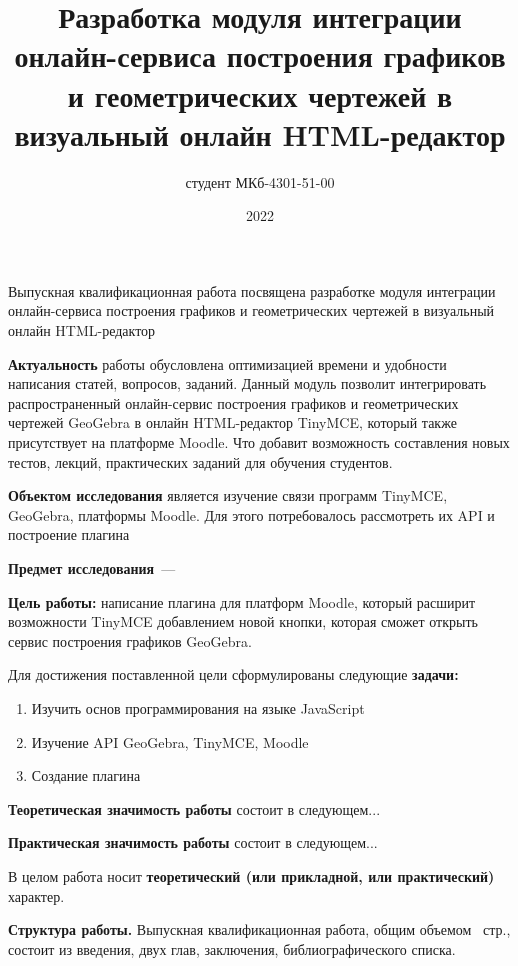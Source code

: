 \documentclass[14pt,Diplom]{diplomwork}
\date{2022}
\author{студент МКб-4301-51-00}{Мельков Алексей Константинович}
\title{Разработка модуля интеграции онлайн-сервиса построения графиков и геометрических чертежей в визуальный онлайн HTML-редактор}
\institute{математики и информационных систем}
\begin{document}
	
\maketitle
\makereferat		%
\newpage

\tableofcontents


Выпускная квалификационная работа посвящена разработке модуля интеграции онлайн-сервиса построения графиков и геометрических чертежей в визуальный онлайн HTML-редактор


\textbf{Актуальность} работы обусловлена оптимизацией времени и удобности написания статей, вопросов, заданий. Данный модуль позволит интегрировать распространенный онлайн-сервис построения графиков и геометрических чертежей GeoGebra в онлайн HTML-редактор TinyMCE, который также присутствует на платформе Moodle. Что добавит возможность составления новых тестов, лекций, практических заданий для обучения студентов.

\textbf{Объектом исследования} является изучение связи программ TinyMCE, GeoGebra, платформы Moodle. Для этого потребовалось рассмотреть их API и построение плагина	

\textbf{Предмет исследования}~--- 

\textbf{Цель работы:} написание плагина для платформ Moodle, который расширит возможности TinyMCE добавлением новой кнопки, которая сможет открыть сервис построения графиков GeoGebra.

Для достижения поставленной цели сформулированы следующие \mbox{\textbf{задачи:}}

\begin{enumerate}
	\item Изучить основ программирования на языке JavaScript
	\item Изучение API GeoGebra, TinyMCE, Moodle
	\item Создание плагина
\end{enumerate}



\textbf{Теоретическая значимость работы} состоит в следующем...

\textbf{Практическая значимость работы} состоит в следующем...

В целом работа носит \textbf{теоретический (или прикладной, или практический)} характер.



\textbf{Структура работы.} Выпускная квалификационная работа, общим объемом \pageref{LastPage}~стр., состоит из введения, двух глав, заключения, библиографического списка.
\end{document}
